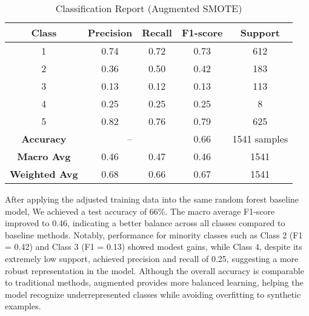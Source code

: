 \begin{table}[!h]
\centering
\caption{Classification Report (Augmented SMOTE)}
\label{tab:aug_smote_imbalanced}
\begin{tabular}{|c|c|c|c|c|}
\hline
\textbf{Class} & \textbf{Precision} & \textbf{Recall} & \textbf{F1-score} & \textbf{Support} \\
\hline
1 & 0.74 & 0.72 & 0.73 & 612 \\
2 & 0.36 & 0.50 & 0.42 & 183 \\
3 & 0.13 & 0.12 & 0.13 & 113 \\
4 & 0.25 & 0.25 & 0.25 & 8 \\
5 & 0.82 & 0.76 & 0.79 & 625 \\
\hline
\textbf{Accuracy} & \multicolumn{2}{|c|}{--} & 0.66 & 1541 samples\\
\hline
\textbf{Macro Avg} & 0.46 & 0.47 & 0.46 & 1541 \\
\textbf{Weighted Avg} & 0.68 & 0.66 & 0.67 & 1541 \\
\hline
\end{tabular}
\end{table}

After applying the adjusted training data into the same random forest baseline model, We achieved a test accuracy of 66\%.
The macro average F1-score improved to 0.46, indicating a better balance across all classes compared to baseline methods.
Notably, performance for minority classes such as Class 2 (F1 = 0.42) and Class 3 (F1 = 0.13) showed modest gains, 
while Class 4, despite its extremely low support, achieved precision and recall of 0.25, suggesting a more robust representation in the model.
Although the overall accuracy is comparable to traditional methods, augmented provides more balanced learning, 
helping the model recognize underrepresented classes while avoiding overfitting to synthetic examples.
